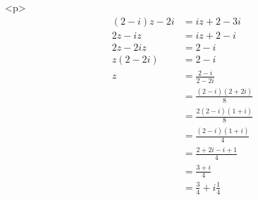 <p>
$$\begin{aligned}
    (2-i)z-2i &= iz + 2 -3i\\
    2z - iz &= iz + 2 -i\\
    2z - 2iz &= 2 -i\\
    z(2 - 2i) &= 2 -i\\
    z &= \frac{2 -i}{2-2i}\\
     &= \frac{(2 -i)(2+2i)}{8}\\
     &= \frac{2(2 -i)(1+i)}{8}\\
     &= \frac{(2 -i)(1+i)}{4}\\
     &= \frac{2+2i-i+1}{4}\\
     &= \frac{3+i}{4}\\
     &= \frac{3}{4}+i\frac{1}{4}\\





\end{aligned}$$
